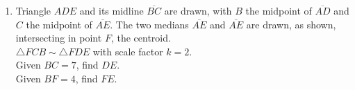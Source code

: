 \documentclass[12pt, twoside]{article}
\begin{document}
\begin{enumerate}
  \item Triangle $ADE$ and its midline $\overline{BC}$ are drawn, with $B$ the midpoint of $\overline{AD}$ and $C$ the midpoint of $\overline{AE}$. The two medians $\overline{AE}$ and $\overline{AE}$ are drawn, as shown, intersecting in point $F$, the centroid.\\[0.25cm]
  $\triangle FCB \sim \triangle FDE$ with scale factor $k=2$.\\[0.25cm]
  Given $BC=7$, find $DE$. \\[0.25cm] Given $BF=4$, find $FE$. \vspace{1cm}
  \begin{center}
    \end{center}



\end{enumerate}
\end{document}

